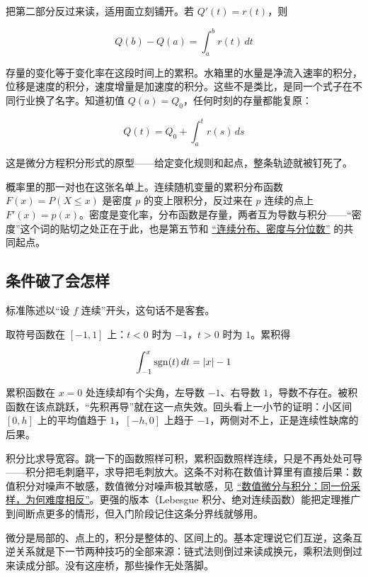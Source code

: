 把第二部分反过来读，适用面立刻铺开。若 \(Q'(t)=r(t)\)，则

\[
Q(b)-Q(a)=\int_a^b r(t)\,dt
\]

存量的变化等于变化率在这段时间上的累积。水箱里的水量是净流入速率的积分，位移是速度的积分，速度增量是加速度的积分。这些不是类比，是同一个式子在不同行业换了名字。知道初值 \(Q(a)=Q_0\)，任何时刻的存量都能复原：

\[
Q(t)=Q_0+\int_a^t r(s)\,ds
\]

这是微分方程积分形式的原型——给定变化规则和起点，整条轨迹就被钉死了。

概率里的那一对也在这张名单上。连续随机变量的累积分布函数 \(F(x)=P(X\le x)\) 是密度 \(p\) 的变上限积分，反过来在 \(p\) 连续的点上 \(F'(x)=p(x)\)。密度是变化率，分布函数是存量，两者互为导数与积分——``密度''这个词的贴切之处正在于此，也是第五节和 \hyperref[sec:05-Probability/03-Random-Variables/03]{``连续分布、密度与分位数''} 的共同起点。

\subsection{条件破了会怎样}

标准陈述以``设 \(f\) 连续''开头，这句话不是客套。

取符号函数在 \([-1,1]\) 上：\(t<0\) 时为 \(-1\)，\(t>0\) 时为 \(1\)。累积得

\[
\int_{-1}^x \operatorname{sgn}(t)\,dt=\left|x\right|-1
\]

累积函数在 \(x=0\) 处连续却有个尖角，左导数 \(-1\)、右导数 \(1\)，导数不存在。被积函数在该点跳跃，``先积再导''就在这一点失效。回头看上一小节的证明：小区间 \([0,h]\) 上的平均值趋于 \(1\)，\([-h,0]\) 上趋于 \(-1\)，两侧对不上，正是连续性缺席的后果。

\begin{remark}
积分比求导宽容。跳一下的函数照样可积，累积函数照样连续，只是不再处处可导——积分把毛刺磨平，求导把毛刺放大。这条不对称在数值计算里有直接后果：数值积分对噪声不敏感，数值微分对噪声极其敏感，见 \hyperref[ch:064]{``数值微分与积分：同一份采样，为何难度相反''}。更强的版本（Lebesgue 积分、绝对连续函数）能把定理推广到间断点更多的情形，但入门阶段记住这条分界线就够用。
\end{remark}

微分是局部的、点上的，积分是整体的、区间上的。基本定理说它们互逆，这条互逆关系就是下一节两种技巧的全部来源：链式法则倒过来读成换元，乘积法则倒过来读成分部。没有这座桥，那些操作无处落脚。